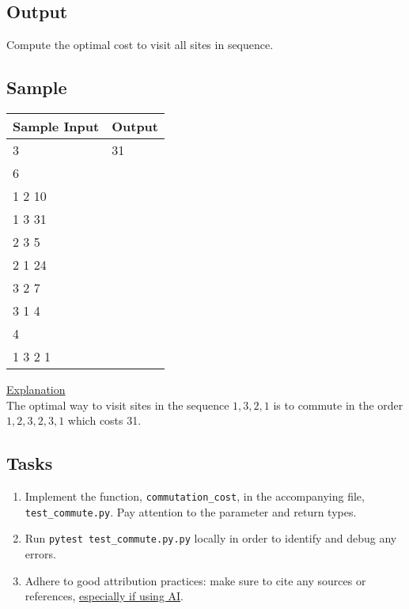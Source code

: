 \documentclass[a4paper]{exam}
\begin{document}
\begin{questions}
  \subsection*{Output}
  Compute the optimal cost to visit all sites in sequence.

  \subsection*{Sample}

  \begin{minipage}[t]{.3\textwidth}
    \begin{tabular}[t]{|l|l|}
      \hline
      Sample Input & Output \\
      \hline

      3            & 31     \\
      6                     \\
      1 2 10                \\
      1 3 31                \\
      2 3 5                 \\
      2 1 24                \\
      3 2 7                 \\
      3 1 4                 \\
      4                     \\
      1 3 2 1               \\
      \hline
    \end{tabular}
  \end{minipage}
  \begin{minipage}[t]{.65\textwidth}
    \vspace{10pt}
    \underline{Explanation}\\
    The optimal way to visit sites in the sequence $1,3,2,1$ is to commute in the order $1,2,3,2,3,1$ which costs 31.
  \end{minipage}

  \subsection*{Tasks}
  \begin{enumerate}
    \item Implement the function, \texttt{commutation_cost}, in the accompanying file, \texttt{test\_commute.py}. Pay attention to the parameter and return types.
    \item Run \texttt{pytest test\_commute.py.py} locally in order to identify and debug any errors.
    \item Adhere to good attribution practices: make sure to cite any sources or references, \href{https://hulms.instructure.com/courses/2616/discussion_topics/29240}{especially if using AI}.
  \end{enumerate}


\end{questions}
\end{document}
